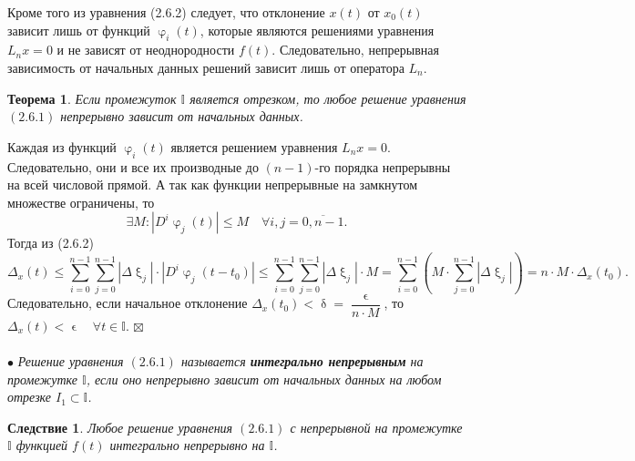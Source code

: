 \documentclass[a4paper, 12pt]{report}
\newenvironment{Proof} %
{\par\noindent{$\blacklozenge$}} %
{\hfill$\scriptstyle\boxtimes$}
\newcommand{\I}{\mathbb{I}}
\renewcommand{\delta}{\updelta}
\renewcommand{\varphi}{\upvarphi}
\renewcommand{\xi}{\upxi}
\newtheorem*{theorem}{Теорема}
\newtheorem*{cor}{Следствие}
\begin{document}
Кроме того из уравнения (2.6.2) следует, что отклонение $x(t)$ от $x_0(t)$ зависит лишь от функций $\varphi_i(t)$, которые являются решениями уравнения $L_nx = 0$ и не зависят от неоднородности $f(t)$. Следовательно, непрерывная зависимость от начальных данных решений зависит лишь от оператора $L_n$.
\begin{theorem}
	Если промежуток $\I$ является отрезком, то любое решение уравнения $(2.6.1)$ непрерывно зависит от начальных данных.
\end{theorem}\begin{Proof}
Каждая из функций $\varphi_i(t)$ является решением уравнения $L_nx = 0$. Следовательно, они и все их производные до $(n-1)$-го порядка непрерывны на всей числовой прямой. А так как функции непрерывные на замкнутом множестве ограничены, то $$\exists M : |D^i\varphi_j(t)|\leqslant M\quad \forall i,j = \overline{0, n-1}.$$
Тогда из (2.6.2) $$\Delta_x(t) \leqslant\sum_{i = 0}^{n-1}\sum_{j = 0}^{n-1} | \Delta \xi_j|\cdot |D^i\varphi_j(t-t_0)|\leqslant \sum_{i = 0}^{n-1}\sum_{j = 0}^{n-1} | \Delta \xi_j|\cdot M = \sum_{i = 0}^{n-1}(M\cdot \sum_{j = 0}^{n-1} | \Delta \xi_j|) = n\cdot M\cdot \Delta_x(t_0).$$
Следовательно, если начальное отклонение $\Delta_x(t_0) < \delta = \dfrac{\upvarepsilon}{n\cdot M}$, то $\Delta_x(t) < \upvarepsilon\quad \forall t \in \I$.
\end{Proof}\\\\
$\bullet$ \textit{Решение уравнения $(2.6.1)$ называется \textbf{интегрально непрерывным} на промежутке $\I$, если оно непрерывно зависит от начальных данных на любом отрезке $I_1 \subset \I$.}
\begin{cor}
	Любое решение уравнения $(2.6.1)$ с непрерывной на промежутке $\I$ функцией $f(t)$ интегрально непрерывно на $\I$.
\end{cor}
\end{document}
